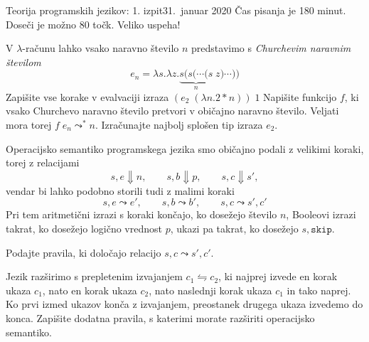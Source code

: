 \documentclass[arhiv]{izpit}
\begin{document}
\newcommand{\bnfis}{\mathrel{{:}{:}{=}}}
\newcommand{\bnfor}{\;\mid\;}
\newcommand{\fun}[2]{\lambda #1. #2}
\newcommand{\conditional}[3]{\mathtt{if}\;#1\;\mathtt{then}\;#2\;\mathtt{else}\;#3}
\newcommand{\whileloop}[2]{\mathtt{while}\;#1\;\mathtt{do}\;#2}
\newcommand{\interleave}[2]{#1 \leftrightharpoons #2}
\newcommand{\recfun}[3]{\mathtt{rec}\;\mathtt{fun}\;#1\;#2. #3}
\newcommand{\boolty}{\mathtt{bool}}
\newcommand{\funty}[2]{#1 \to #2}
\newcommand{\tru}{\mathtt{true}}
\newcommand{\fls}{\mathtt{false}}
\newcommand{\tbool}{\mathtt{bool}}
\newcommand{\tand}{\mathbin{\mathtt{and}}}
\newcommand{\tandalso}{\mathbin{\mathtt{andalso}}}

\izpit
  {Teorija programskih jezikov: 1. izpit}{31.\ januar 2020}{
  Čas pisanja je 180 minut. Doseči je možno 80 točk. Veliko uspeha!
}


\naloga[\tocke{20}]
V $\lambda$-računu lahko vsako naravno število $n$ predstavimo s \emph{Churchevim naravnim številom}
\[
  e_n = \fun{s} \fun{z} \underbrace{s (s (\cdots (s}_n \; z) \cdots))
\]
\podnaloga Zapišite vse korake v evalvaciji izraza $(e_2 \; (\fun{n} 2 * n)) \; 1$ \prostor
\podnaloga Napišite funkcijo $f$, ki vsako Churchevo naravno število pretvori v običajno naravno število. Veljati mora torej $f \; e_n \leadsto^* n$. \prostor
\podnaloga Izračunajte najbolj splošen tip izraza $e_2$. \prostor


\naloga[\tocke{20}]
\newcommand{\skp}{\mathtt{skip}}
Operacijsko semantiko programskega jezika {\imp} smo običajno podali z velikimi koraki, torej z relacijami
\[
  s, e \Downarrow n, \qquad s, b \Downarrow p, \qquad s, c \Downarrow s',
\]
vendar bi lahko podobno storili tudi z malimi koraki
\[
  s, e \leadsto e', \qquad s, b \leadsto b', \qquad s, c \leadsto s', c'
\]
Pri tem aritmetični izrazi s koraki končajo, ko dosežejo število $n$, Booleovi izrazi takrat, ko dosežejo logično vrednost $p$, ukazi pa takrat, ko dosežejo $s, \skp$.

\podnaloga Podajte pravila, ki določajo relacijo $s, c \leadsto s', c'$.

\podnaloga Jezik {\imp} razširimo s prepletenim izvajanjem $\interleave{c_1}{c_2}$, ki najprej izvede en korak ukaza $c_1$, nato en korak ukaza $c_2$, nato naslednji korak ukaza $c_1$ in tako naprej. Ko prvi izmed ukazov konča z izvajanjem, preostanek drugega ukaza izvedemo do konca. Zapišite dodatna pravila, s katerimi morate razširiti operacijsko semantiko.
\prostor[2]
\end{document}
